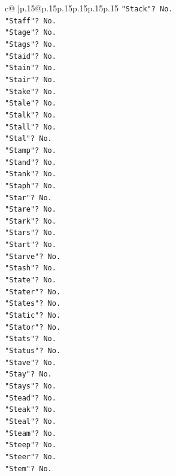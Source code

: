 \documentclass{article}
\begin{document}
{\begin{supertabular}{c@{$\;$}|p{.15\linewidth}@{}p{.15\linewidth}p{.15\linewidth}p{.15\linewidth}p{.15\linewidth}p{.15\linewidth}}
{{{\texttt{"Stack"? No.} \\
\texttt{"Staff"? No.} \\
\texttt{"Stage"? No.} \\
\texttt{"Stags"? No.} \\
\texttt{"Staid"? No.} \\
\texttt{"Stain"? No.} \\
\texttt{"Stair"? No.} \\
\texttt{"Stake"? No.} \\
\texttt{"Stale"? No.} \\
\texttt{"Stalk"? No.} \\
\texttt{"Stall"? No.} \\
\texttt{"Stal"? No.} \\
\texttt{"Stamp"? No.} \\
\texttt{"Stand"? No.} \\
\texttt{"Stank"? No.} \\
\texttt{"Staph"? No.} \\
\texttt{"Star"? No.} \\
\texttt{"Stare"? No.} \\
\texttt{"Stark"? No.} \\
\texttt{"Stars"? No.} \\
\texttt{"Start"? No.} \\
\texttt{"Starve"? No.} \\
\texttt{"Stash"? No.} \\
\texttt{"State"? No.} \\
\texttt{"Stater"? No.} \\
\texttt{"States"? No.} \\
\texttt{"Static"? No.} \\
\texttt{"Stator"? No.} \\
\texttt{"Stats"? No.} \\
\texttt{"Status"? No.} \\
\texttt{"Stave"? No.} \\
\texttt{"Stay"? No.} \\
\texttt{"Stays"? No.} \\
\texttt{"Stead"? No.} \\
\texttt{"Steak"? No.} \\
\texttt{"Steal"? No.} \\
\texttt{"Steam"? No.} \\
\texttt{"Steep"? No.} \\
\texttt{"Steer"? No.} \\
\texttt{"Stem"? No.} \\
}}}
\end{supertabular}}
\end{document}
